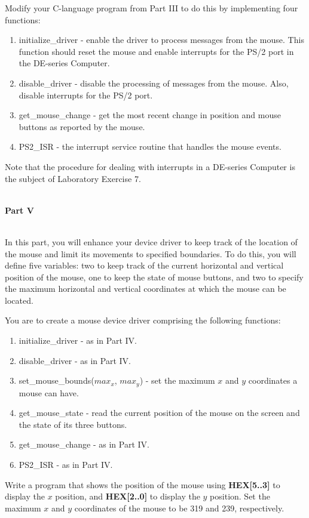 \documentclass[epsfig,10pt,fullpage]{article}
\begin{document}
Modify your C-language program from Part III to do this by implementing four functions:
\begin{enumerate}
	\item initialize\_driver - enable the driver to process messages from the mouse. This function should reset the mouse and enable interrupts for the PS/2 port in the DE-series Computer.
	\item disable\_driver - disable the processing of messages from the mouse. Also, disable interrupts for the PS/2 port.
	\item get\_mouse\_change - get the most recent change in position and mouse buttons as reported by the mouse.
	\item PS2\_ISR - the interrupt service routine that handles the mouse events.
\end{enumerate}

Note that the procedure for dealing with interrupts in a DE-series Computer is the subject of Laboratory Exercise 7.

~\\
\noindent
{\bf Part V}

~\\
\noindent
In this part, you will enhance your device driver to keep track of the location of the mouse and limit its movements to specified boundaries. To do this, you will define five variables: two to keep track of the current horizontal and vertical position of the mouse, one to keep the state of mouse buttons, and two to specify the maximum horizontal and vertical coordinates at which the mouse can be located. 

You are to create a mouse device driver comprising the following functions:
\begin{enumerate}
	\item initialize\_driver - as in Part IV.
	\item disable\_driver - as in Part IV.
	\item set\_mouse\_bounds($max_x$, $max_y$) - set the maximum $x$ and $y$ coordinates a mouse can have.
	\item get\_mouse\_state - read the current position of the mouse on the screen and the state of its three buttons.
	\item get\_mouse\_change - as in Part IV.
	\item PS2\_ISR - as in Part IV.
\end{enumerate}

Write a program that shows the position of the mouse using {\bf HEX[5..3]} to display the $x$ position, and {\bf HEX[2..0]} to display the $y$ position. Set the maximum $x$ and $y$ coordinates of the mouse to be 319 and 239, respectively.
 
\end{document}

